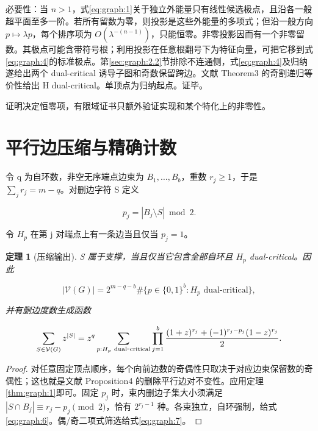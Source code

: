 \documentclass[11pt,a4paper,oneside]{ctexrep}
\theoremstyle{cnplain}
\newtheorem{theorem}{定理}[chapter]
\theoremstyle{definition}
\theoremstyle{remark}
\begin{document}
必要性：当 \(n>1\)，式\eqref{eq:graph:1}关于独立外能量只有线性候选极点，且沿各一般超平面至多一阶。若所有留数为零，则投影是这些外能量的多项式；但沿一般方向 \(p\mapsto\lambda p\)，每个排序项为 \(O(\lambda^{-(n-1)})\)，只能恒零。非零投影因而有一个非零留数。其极点可能含带符号根；利用投影在任意根翻号下为特征向量，可把它移到式\eqref{eq:graph:4}的标准极点。第\ref{sec:graph:2.2}节排除不连通侧，式\eqref{eq:graph:4}及归纳遂给出两个 dual-critical 诱导子图和奇数保留跨边。文献\cite{dualcritical} Theorem3 的奇割递归等价性给出 H dual-critical。单顶点为归纳起点。证毕。

证明决定恒零项，有限域证书只额外验证实现和某个特化上的非零性。

\section{平行边压缩与精确计数}\label{sec:graph:3}

令 q 为自环数，非空无序端点边束为 \(B_1,\ldots,B_b\)，重数 \(r_j\ge1\)，于是 \(\sum_jr_j=m-q\)。对删边字符 S 定义

\begin{equation}
p_j=|B_j\setminus S|\bmod2.
\end{equation}

令 \(H_p\) 在第 j 对端点上有一条边当且仅当 \(p_j=1\)。

\begin{theorem}[压缩输出]

\label{thm:graph:2} S 属于支撑，当且仅当它包含全部自环且 \(H_p\) dual-critical。因此

\begin{equation}
|\mathcal V(G)|=2^{m-q-b}
    \#\{p\in\{0,1\}^b:H_p\text{ dual-critical}\},             \label{eq:graph:6}
\end{equation}

并有删边度数生成函数

\begin{equation}
\sum_{S\in\mathcal V(G)}z^{|S|}
 =z^q\sum_{p:H_p\ {\rm dual\mbox{-}critical}}
   \prod_{j=1}^b
   \frac{(1+z)^{r_j}+(-1)^{r_j-p_j}(1-z)^{r_j}}2.           \label{eq:graph:7}
\end{equation}

\end{theorem}

\begin{proof}

对任意固定顶点顺序，每个向前边数的奇偶性只取决于对应边束保留数的奇偶性；这也就是文献\cite{dualcritical} Proposition4 的删除平行边对不变性。应用定理\ref{thm:graph:1}即可。固定 \(p_j\) 时，束内删边子集大小须满足 \(|S\cap B_j|\equiv r_j-p_j\pmod2\)，恰有 \(2^{r_j-1}\) 种。各束独立，自环强制，给式\eqref{eq:graph:6}。偶/奇二项式筛选给式\eqref{eq:graph:7}。

\end{proof}
\end{document}
